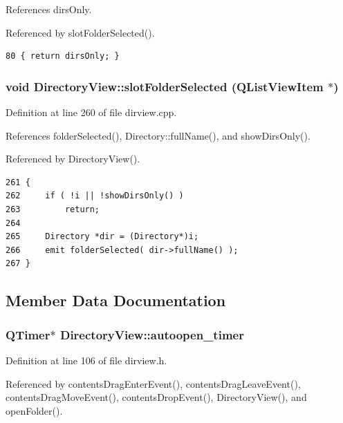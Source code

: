 References dirs\-Only.

Referenced by slot\-Folder\-Selected().



\footnotesize\begin{verbatim}80 { return dirsOnly; }
\end{verbatim}\normalsize 
{}
\subsubsection{\setlength{\rightskip}{0pt plus 5cm}void Directory\-View::slot\-Folder\-Selected (QList\-View\-Item $\ast$)\hspace{0.3cm}{\tt  [protected, slot]}}\label{classDirectoryView_DirectoryViewj0}




Definition at line 260 of file dirview.cpp.

References folder\-Selected(), Directory::full\-Name(), and show\-Dirs\-Only().

Referenced by Directory\-View().



\footnotesize\begin{verbatim}261 {
262     if ( !i || !showDirsOnly() )
263         return;
264 
265     Directory *dir = (Directory*)i;
266     emit folderSelected( dir->fullName() );
267 }
\end{verbatim}\normalsize 


\subsection{Member Data Documentation}
\subsubsection{\setlength{\rightskip}{0pt plus 5cm}QTimer$\ast$ {\bf Directory\-View::autoopen\_\-timer}\hspace{0.3cm}{\tt  [private]}}\label{classDirectoryView_DirectoryViewr3}




Definition at line 106 of file dirview.h.

Referenced by contents\-Drag\-Enter\-Event(), contents\-Drag\-Leave\-Event(), contents\-Drag\-Move\-Event(), contents\-Drop\-Event(), Directory\-View(), and open\-Folder().
